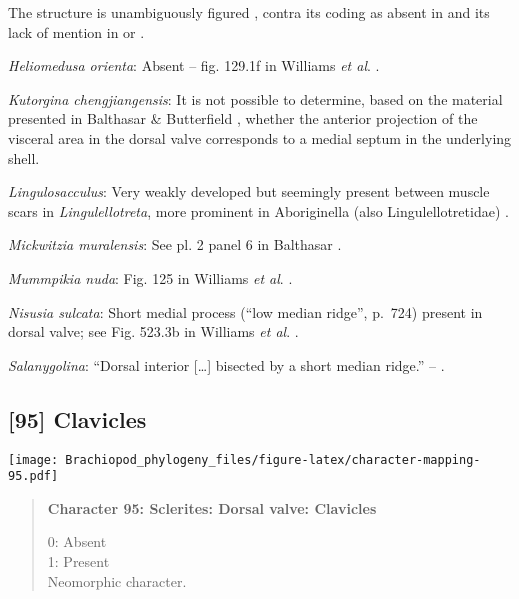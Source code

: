 \documentclass[openany]{book}
\theoremstyle{definition}
\theoremstyle{definition}
\theoremstyle{definition}
\theoremstyle{remark}
\begin{document}
The structure is unambiguously figured \citep[e.g.~fig. 5.1
in][]{Chen2007Reinterpretationof}, contra its coding as absent in
\citet{Williams2000LinguliformeaCraniiformea} and its lack of mention in
\citet{Williams2007Supplement} or \citet{Zhang2009Architectureand}.

\hypertarget{Heliomedusa_orienta-coding-94}{}
\emph{Heliomedusa orienta}: Absent -- fig. 129.1f in Williams \emph{et
al}. \citeyearpar{Williams2000LinguliformeaCraniiformea}.

\hypertarget{Kutorgina_chengjiangensis-coding-94}{}
\emph{Kutorgina chengjiangensis}: It is not possible to determine, based
on the material presented in Balthasar \& Butterfield
\citeyearpar{Balthasar2009EarlyCambrian}, whether the anterior
projection of the visceral area in the dorsal valve corresponds to a
medial septum in the underlying shell.

\hypertarget{Lingulosacculus-coding-94}{}
\emph{Lingulosacculus}: Very weakly developed but seemingly present
between muscle scars in \emph{Lingulellotreta}, more prominent in
Aboriginella (also Lingulellotretidae) \citep[fig.
34]{Williams2000LinguliformeaCraniiformea}.

\hypertarget{Mickwitzia_muralensis-coding-94}{}
\emph{Mickwitzia muralensis}: See pl. 2 panel 6 in Balthasar
\citeyearpar{Balthasar2008iMummpikia}.

\hypertarget{Mummpikia_nuda-coding-94}{}
\emph{Mummpikia nuda}: Fig. 125 in Williams \emph{et al}.
\citeyearpar{Williams2000LinguliformeaCraniiformea}.

\hypertarget{Nisusia_sulcata-coding-94}{}
\emph{Nisusia sulcata}: Short medial process (``low median ridge'',
p.~724) present in dorsal valve; see Fig. 523.3b in Williams \emph{et
al}. \citeyearpar{Williams2000LinguliformeaCraniiformea}.

\hypertarget{Salanygolina-coding-94}{}
\emph{Salanygolina}: ``Dorsal interior {[}\ldots{}{]} bisected by a
short median ridge.'' -- \citet{Popov2009Earlyontogeny}.

\subsection*{{[}95{]} Clavicles}\label{clavicles}

\texttt{[image: Brachiopod\_phylogeny\_files/figure-latex/character-mapping-95.pdf]}

\begin{quote}
\textbf{Character 95: Sclerites: Dorsal valve: Clavicles}

0: Absent\\
1: Present\\
Neomorphic character.
\end{quote}
\end{document}
